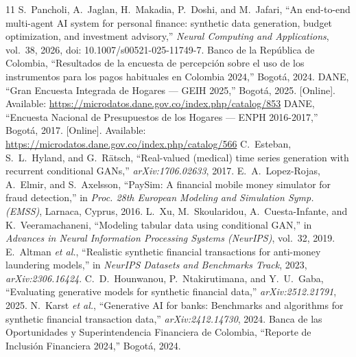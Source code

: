 \documentclass[journal]{IEEEtai}
\begin{document}
\begin{thebibliography}{11}
 S.~Pancholi, A.~Jaglan, H.~Makadia, P.~Doshi, and M.~Jafari, ``An end-to-end multi-agent AI system for personal finance: synthetic data generation, budget optimization, and investment advisory,'' \textit{Neural Computing and Applications}, vol.~38, 2026, doi: 10.1007/s00521-025-11749-7.
 Banco de la República de Colombia, ``Resultados de la encuesta de percepción sobre el uso de los instrumentos para los pagos habituales en Colombia 2024,'' Bogotá, 2024.
 DANE, ``Gran Encuesta Integrada de Hogares --- GEIH 2025,'' Bogotá, 2025. [Online]. Available: \url{https://microdatos.dane.gov.co/index.php/catalog/853}
 DANE, ``Encuesta Nacional de Presupuestos de los Hogares --- ENPH 2016-2017,'' Bogotá, 2017. [Online]. Available: \url{https://microdatos.dane.gov.co/index.php/catalog/566}
 C.~Esteban, S.~L.~Hyland, and G.~Rätsch, ``Real-valued (medical) time series generation with recurrent conditional GANs,'' \textit{arXiv:1706.02633}, 2017.
 E.~A.~Lopez-Rojas, A.~Elmir, and S.~Axelsson, ``PaySim: A financial mobile money simulator for fraud detection,'' in \textit{Proc. 28th European Modeling and Simulation Symp. (EMSS)}, Larnaca, Cyprus, 2016.
 L.~Xu, M.~Skoularidou, A.~Cuesta-Infante, and K.~Veeramachaneni, ``Modeling tabular data using conditional GAN,'' in \textit{Advances in Neural Information Processing Systems (NeurIPS)}, vol.~32, 2019.
 E.~Altman \textit{et al.}, ``Realistic synthetic financial transactions for anti-money laundering models,'' in \textit{NeurIPS Datasets and Benchmarks Track}, 2023, \textit{arXiv:2306.16424}.
 C.~D.~Hounwanou, P.~Ntakirutimana, and Y.~U.~Gaba, ``Evaluating generative models for synthetic financial data,'' \textit{arXiv:2512.21791}, 2025.
 N.~Karst \textit{et al.}, ``Generative AI for banks: Benchmarks and algorithms for synthetic financial transaction data,'' \textit{arXiv:2412.14730}, 2024.
 Banca de las Oportunidades y Superintendencia Financiera de Colombia, ``Reporte de Inclusión Financiera 2024,'' Bogotá, 2024.
\end{thebibliography}
\end{document}
